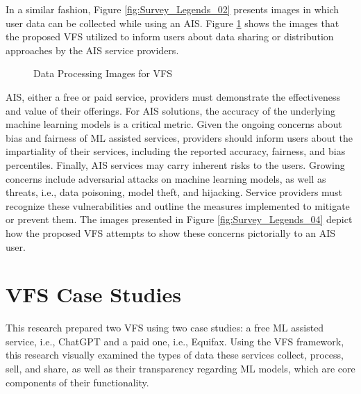 \documentclass[manuscript,review,anonymous]{acmart}
\begin{document}
	In a similar fashion, Figure \ref{fig:Survey_Legends_02} presents images in which user data can be collected while using an AIS. Figure \ref{fig:Survey_Legends_03} shows the images that the proposed VFS utilized to inform users about data sharing or distribution approaches by the AIS service providers.

	\begin{figure}[!t]
		\begin{minipage}{0.48\textwidth}
			\centering
			\scalebox{0.42} {}
			\caption{Data Collection Images for VFS}
			\label{fig:Survey_Legends_02}
		\end{minipage}
		\hfill %
		\begin{minipage}{0.48\textwidth}
			\centering
			\scalebox{0.42} {}
			\caption{Data Processing Images for VFS}
			\label{fig:Survey_Legends_03}
		\end{minipage}
	\end{figure}

	AIS, either a free or paid service, providers must demonstrate the effectiveness and value of their offerings. For AIS solutions, the accuracy of the underlying machine learning models is a critical metric. Given the ongoing concerns about bias and fairness of ML assisted services, providers should inform users about the impartiality of their services, including the reported accuracy, fairness, and bias percentiles. Finally, AIS services may carry inherent risks to the users. Growing concerns include adversarial attacks on machine learning models, as well as threats, i.e., data poisoning, model theft, and hijacking. Service providers must recognize these vulnerabilities and outline the measures implemented to mitigate or prevent them. The images presented in Figure \ref{fig:Survey_Legends_04} depict how the proposed VFS attempts to show these concerns pictorially to an AIS user.

\section{VFS Case Studies}\label{example}

	This research prepared two VFS using two case studies: a free ML assisted service, i.e., ChatGPT and a paid one, i.e., Equifax. Using the VFS framework, this research visually examined the types of data these services collect, process, sell, and share, as well as their transparency regarding ML models, which are core components of their functionality.
\end{document}
